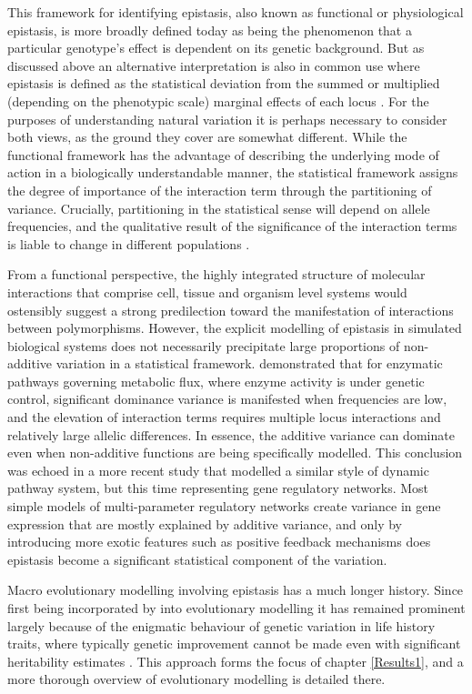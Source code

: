 This framework for identifying epistasis, also known as functional or physiological epistasis, is more broadly defined today as being the phenomenon that a particular genotype's effect is dependent on its genetic background. But as discussed above an alternative interpretation is also in common use where epistasis is defined as the statistical deviation from the summed or multiplied (depending on the phenotypic scale) marginal effects of each locus \citep{Fisher1918, Kempthorne1954}. For the purposes of understanding natural variation it is perhaps necessary to consider both views, as the ground they cover are somewhat different. While the functional framework has the advantage of describing the underlying mode of action in a biologically understandable manner, the statistical framework assigns the degree of importance of the interaction term through the partitioning of variance. Crucially, partitioning in the statistical sense will depend on allele frequencies, and the qualitative result of the significance of the interaction terms is liable to change in different populations \citep{Greene2009}.

From a functional perspective, the highly integrated structure of molecular interactions that comprise cell, tissue and organism level systems would ostensibly suggest a strong predilection toward the manifestation of interactions between polymorphisms. However, the explicit modelling of epistasis in simulated biological systems does not necessarily precipitate large proportions of non-additive variation in a statistical framework. \citet{Keightley1989} demonstrated that for enzymatic pathways governing metabolic flux, where enzyme activity is under genetic control, significant dominance variance is manifested when frequencies are low, and the elevation of interaction terms requires multiple locus interactions and relatively large allelic differences. In essence, the additive variance can dominate even when non-additive functions are being specifically modelled. This conclusion was echoed in a more recent study \citep{Gjuvsland2007} that modelled a similar style of dynamic pathway system, but this time representing gene regulatory networks. Most simple models of multi-parameter regulatory networks create variance in gene expression that are mostly explained by additive variance, and only by introducing more exotic features such as positive feedback mechanisms does epistasis become a significant statistical component of the variation. 

Macro evolutionary modelling involving epistasis has a much longer history. Since first being incorporated by \citet{Wright1931} into evolutionary modelling it has remained prominent largely because of the enigmatic behaviour of genetic variation in life history traits, where typically genetic improvement cannot be made even with significant heritability estimates \citep{Hansen2004}. This approach forms the focus of chapter \ref{Results1}, and a more thorough overview of evolutionary modelling is detailed there. 

